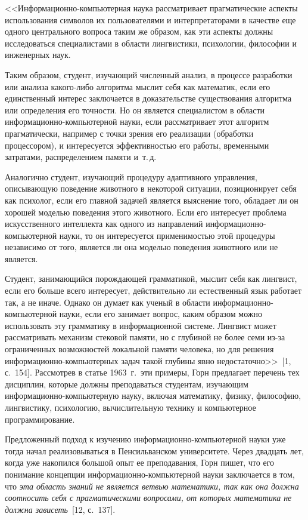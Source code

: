 \begin{multicols}{2}
      <<Информационно-компьютерная наука рас\-смат\-ри\-ва\-ет прагматические аспекты
использования символов их пользователями и интерпретаторами в качестве еще одного
центрального вопроса таким же образом, как эти аспекты должны исследоваться специалистами
в области лингвистики, психологии, философии и инженерных наук.

      Таким образом, студент, изучающий численный анализ, в процессе разработки или
анализа какого-либо алгоритма мыслит себя как математик, если его единственный интерес
заключается в доказательстве существования алгоритма или определения его точности. Но он
является специалистом в области информационно-компьютерной науки, если рассматривает
этот алгоритм прагматически, например с точки зрения его реализации (обработки
процессором), и интересуется эффективностью его работы, временными затратами,
распределением памяти и~т.\,д.

      Аналогично студент, изучающий процедуру адап\-тив\-но\-го управления, описывающую
поведение животного в некоторой ситуации, позиционирует себя как психолог, если его
главной задачей является выяснение того, обладает ли он хорошей моделью поведения этого
животного. Если его интересует проблема искусственного интеллекта как одного из
направлений ин\-фор\-ма\-ци\-он\-но-ком\-пью\-тер\-ной науки, то он интересуется применимостью этой
процедуры независимо от того, является ли она моделью поведения животного или не яв\-ля\-ется.

      Студент, занимающийся порождающей грамматикой, мыслит себя как лингвист, если его
больше всего интересует, действительно ли естественный язык работает так, а не иначе. Однако
он думает как ученый в области информационно-компьютерной науки, если его занимает
вопрос, каким образом можно использовать эту грамматику в информационной системе.
Лингвист может рассматривать механизм стековой памяти, но с глубиной не более семи из-за
ограниченных возможностей локальной памяти человека, но для решения 
информационно-компьютерных задач такой глубины явно недостаточно>>~[1, с.~154].
      Рассмотрев в статье 1963~г.\ эти примеры, Горн предлагает перечень тех дисциплин,
которые должны преподаваться студентам, изучающим ин\-фор\-ма\-ци\-он\-но-компьютерную науку,
включая математику, физику, философию, лингвистику, психологию, вычислительную технику
и компьютерное программирование.

      Предложенный подход к изучению ин\-фор\-ма\-ци\-он\-но-компью\-тер\-ной науки уже тогда
начал реализовываться в Пенсильванском университете. Через двадцать лет, когда уже
накопился большой опыт ее преподавания, Горн пишет, что его понимание концепции
ин\-фор\-ма\-ци\-он\-но-компью\-тер\-ной науки заключается в том, что \textit{эта область знаний не
является ветвью математики, так как она должна соотносить себя с прагматическими
вопросами, от которых математика не должна зависеть}~[12, с.~137].


\end{multicols}
